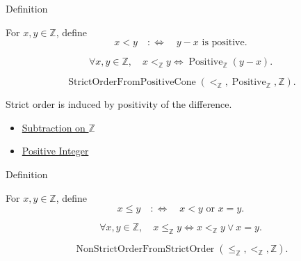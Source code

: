 \begin{definitionbox}{Definition}
\begin{definition}
\label{def:strict-order-on-z}
For $x,y\in\mathbb{Z}$, define
\[
x<y \quad:\Longleftrightarrow\quad y-x \text{ is positive}.
\]
\end{definition}
\end{definitionbox}

\begin{remark*}
\[
\forall x,y\in\mathbb{Z},\quad
x<_{\mathbb{Z}}y
\Longleftrightarrow
\operatorname{Positive}_{\mathbb{Z}}(y-x).
\]
\end{remark*}

\begin{remark*}
\[
\operatorname{StrictOrderFromPositiveCone}(<_{\mathbb{Z}},\operatorname{Positive}_{\mathbb{Z}},\mathbb{Z}).
\]
\end{remark*}

\begin{remark*}[Interpretation]
Strict order is induced by positivity of the difference.
\end{remark*}

\begin{dependencies}
\begin{itemize}
  \item \hyperref[def:subtraction-on-z]{Subtraction on $\mathbb{Z}$}
  \item \hyperref[def:positive-integer]{Positive Integer}
\end{itemize}
\end{dependencies}

\begin{definitionbox}{Definition}
\begin{definition}
\label{def:order-on-z}
For $x,y\in\mathbb{Z}$, define
\[
x\le y \quad:\Longleftrightarrow\quad x<y \text{ or } x=y.
\]
\end{definition}
\end{definitionbox}

\begin{remark*}
\[
\forall x,y\in\mathbb{Z},\quad
x\le_{\mathbb{Z}}y
\Longleftrightarrow
x<_{\mathbb{Z}}y\lor x=y.
\]
\end{remark*}

\begin{remark*}
\[
\operatorname{NonStrictOrderFromStrictOrder}(\le_{\mathbb{Z}},<_{\mathbb{Z}},\mathbb{Z}).
\]
\end{remark*}

